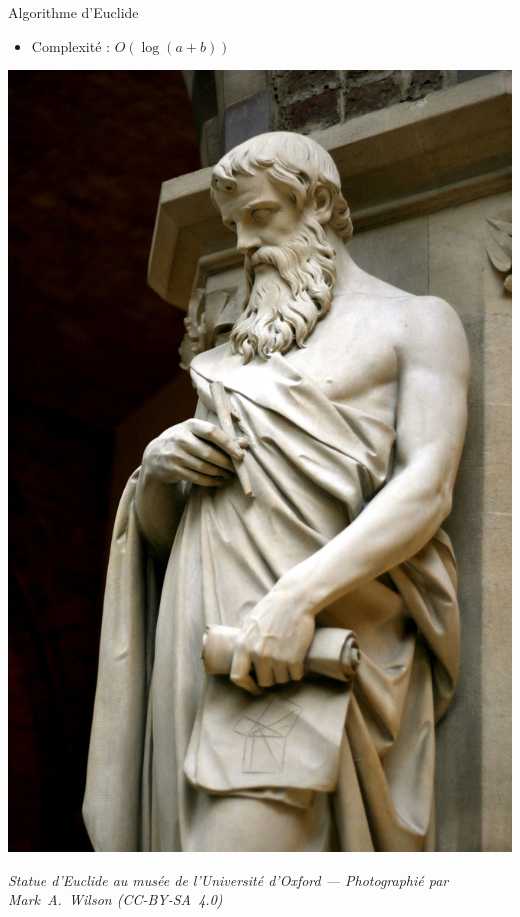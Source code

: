 \documentclass{main}
\begin{document}
\begin{frame}{Algorithme d’Euclide}
\begin{minipage}{\dimexpr.7\textwidth-2em}
        \vspace*{.25em}
        \begin{itemize}
            \item Complexité : \(O(\log(a + b))\)
        \end{itemize}
    \end{minipage}\hfill%
    \begin{minipage}{.3\textwidth}
        \raggedleft
        \includegraphics[width=\linewidth]{figs/euclid}
        
        \vspace{.5em}
        \tiny\itshape
        Statue d’Euclide au musée de l’Université d'Oxford --- Photographié par Mark~A.~Wilson (CC-BY-SA~4.0)
    \end{minipage}
\end{frame}
\end{document}
